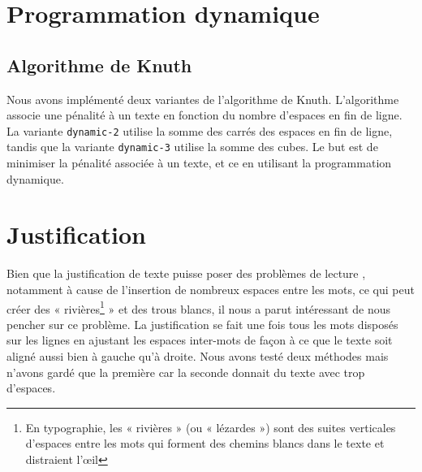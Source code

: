 \documentclass[a4paper, 11pt]{article}
\begin{document}
\section{Programmation dynamique}

\subsection{Algorithme de Knuth}

Nous avons implémenté deux variantes de l'algorithme de Knuth. L'algorithme
associe une pénalité à un texte en fonction du nombre d'espaces en fin de ligne.
La variante \verb|dynamic-2| utilise la somme des carrés des espaces en fin de
ligne, tandis que la variante \verb|dynamic-3| utilise la somme des cubes. Le
but est de minimiser la pénalité associée à un texte, et ce en utilisant la
programmation dynamique.


\section{Justification}
\label{sec:justification}

Bien que la justification de texte puisse poser des problèmes de lecture
\cite{Van96cognitive}, notamment à cause de l'insertion de nombreux espaces
entre les mots, ce qui peut créer des « rivières\footnote{En typographie, les
« rivières » (ou « lézardes ») sont des suites verticales d'espaces entre les
mots qui forment des chemins blancs dans le texte et distraient
l'œil\cite{Harkins12fr}} » et des trous blancs, il nous a parut intéressant de
nous pencher sur ce problème. La justification se fait une fois tous les mots
disposés sur les lignes en ajustant les espaces inter-mots de façon à ce que le
texte soit aligné aussi bien à gauche qu'à droite. Nous avons testé deux
méthodes mais n'avons gardé que la première car la seconde donnait du texte avec
trop d'espaces.
\end{document}
